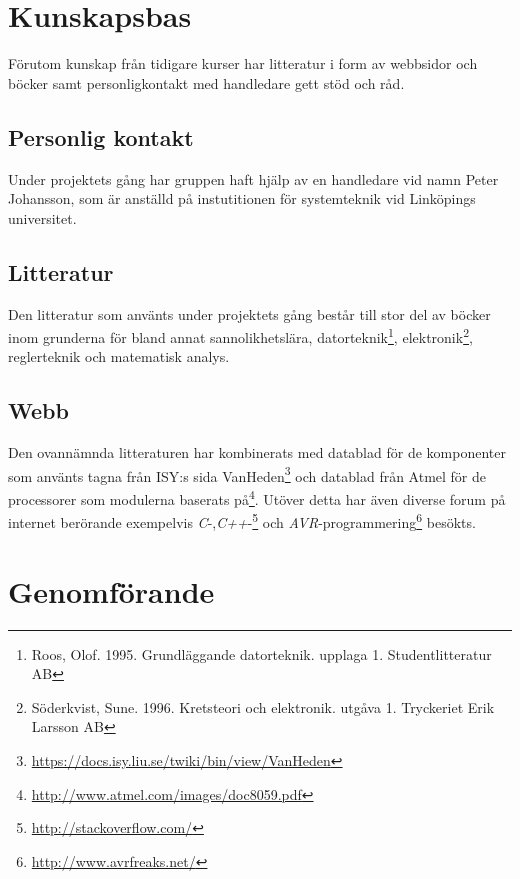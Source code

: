 \documentclass[a4paper,12pt,fleqn]{article}
\begin{document}
\section{Kunskapsbas}

Förutom kunskap från tidigare kurser har litteratur i form av webbsidor och böcker samt personligkontakt med handledare gett stöd och råd. 

\subsection{Personlig kontakt}
Under projektets gång har gruppen haft hjälp av en handledare vid namn Peter Johansson, som är anställd på instutitionen för systemteknik vid Linköpings universitet. 

\subsection{Litteratur}
Den litteratur som använts under projektets gång består till stor del av böcker inom grunderna för bland annat sannolikhetslära, datorteknik\footnote{Roos, Olof. 1995. Grundläggande datorteknik. upplaga 1. Studentlitteratur AB}, elektronik\footnote{Söderkvist, Sune. 1996. Kretsteori och elektronik. utgåva 1. Tryckeriet Erik Larsson AB}, reglerteknik och matematisk analys.

\subsection{Webb}
Den ovannämnda litteraturen har kombinerats med datablad för de komponenter som använts tagna från ISY:s sida VanHeden\footnote{\url{https://docs.isy.liu.se/twiki/bin/view/VanHeden}} och datablad från Atmel för de processorer som modulerna baserats på\footnote{\url{http://www.atmel.com/images/doc8059.pdf}}. 
Utöver detta har även diverse forum på internet berörande exempelvis \emph{C}-,\emph{C++}-\footnote{\url{http://stackoverflow.com/}} och \emph{AVR}-programmering\footnote{\url{http://www.avrfreaks.net/}} besökts.


\section{Genomförande}
\end{document}

